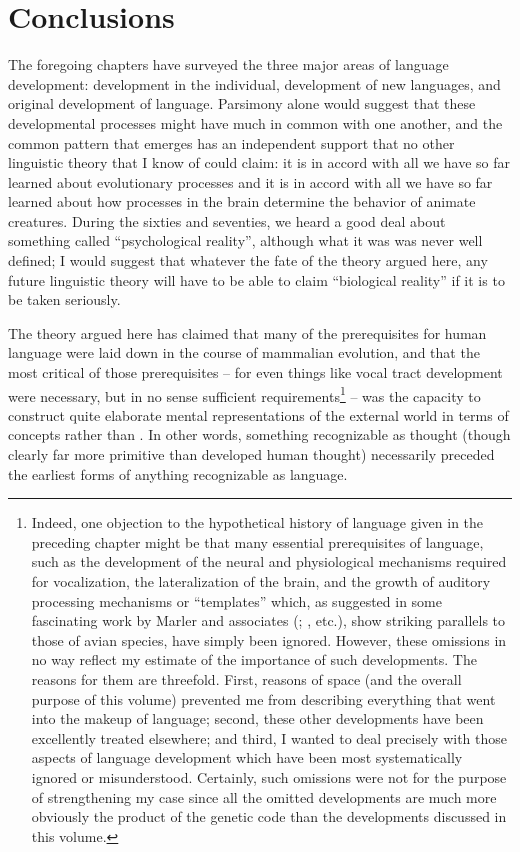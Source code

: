 \chapter{Conclusions}\label{ch:5}

The foregoing chapters have surveyed the three major areas of language development: development in the individual, development of new languages, and original development of language. Parsimony alone would suggest that these developmental processes might have much in common with one another, and the common pattern that emerges has an independent support that no other linguistic theory that I know of could claim: it is in accord with all we have so far learned about evolutionary processes and it is in accord with all we have so far learned about how processes in the brain determine the behavior of animate creatures. During the sixties and seventies, we heard a good deal about something called ``psychological reality'', although what it was was never well defined; I would suggest that whatever the fate of the theory argued here, any future linguistic theory will have to be able to claim ``biological reality'' if it is to be taken seriously. 

The theory argued here has claimed that many of the prerequisites for human language were laid down in the course of mammalian evolution, and that the most critical of those prerequisites -- for even things like vocal tract development were necessary, but in no sense sufficient requirements\footnote{Indeed, one objection to the hypothetical history of language given in the preceding chapter might be that many essential prerequi\-sites of language, such as the development of the neural and physiological mechanisms required for vocalization, the lateralization of the brain, and the growth of auditory processing mechanisms or ``templates'' which, as suggested in some fascinating work by Marler and associates (\citealt{Marler1977,Marler1980}; \citealt{MarlerEtAl1979}, etc.), show striking parallels to those of avian species, have simply been ignored. However, these omissions in no way reflect my estimate of the impor\-tance of such developments. The reasons for them are threefold. First, reasons of space (and the overall purpose of this volume) pre\-vented me from describing everything that went into the makeup of language; second, these other developments have been excellently treated elsewhere; and third, I wanted to deal precisely with those aspects of language development which have been most systematically ignored or misunderstood. Certainly, such omissions were not for the purpose of strengthening my case since all the omitted developments are much more obviously the product of the genetic code than the developments discussed in this volume.} -- was the capacity to construct quite elaborate mental representations of the external world in terms of concepts rather than . In other words, something recognizable as thought (though clearly far more primitive than developed human thought) necessarily preceded the earliest forms of anything recognizable as language.

